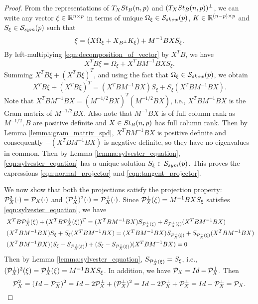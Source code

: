 \documentclass[11pt,a4paper]{article}
\begin{document}
\begin{proof}
From the representations of $T_XSt_B(n,p)$ and $(T_XSt_B(n,p))^\perp$, we can write any vector $\xi\in \mathbb{R}^{n\times p}$ in terms of unique $\Omega_\xi\in \mathcal{S}_{skew}(p)$, $K\in \mathbb{R}^{(n-p)\times p}$ and $S_\xi\in \mathcal{S}_{sym}(p)$ such that
\begin{equation}\label{eqn:decomposition_of_vector}
\xi = (X\Omega_\xi + X_{B^\perp} K_\xi) + M^{-1}BXS_\xi.
\end{equation}
By left-multiplying \eqref{eqn:decomposition_of_vector} by $X^TB$, we have
\begin{equation*}
X^TB\xi = \Omega_\xi + X^TBM^{-1}BXS_\xi.
\end{equation*}
Summing $X^TB\xi+(X^TB\xi)^T$, and using the fact that $\Omega_\xi\in\mathcal{S}_{skew}(p)$, we obtain
\begin{equation}\label{eqn:sylvester_equation}
X^TB\xi+(X^TB\xi)^T = (X^TBM^{-1}BX)S_\xi + S_\xi(X^TBM^{-1}BX).
\end{equation}
Note that $X^TBM^{-1}BX = (M^{-1/2}BX)^T(M^{-1/2}BX)$, i.e., $X^TBM^{-1}BX$ is the Gram matrix of $M^{-1/2}BX$. Also note that $M^{-1}BX$ is of full column rank as $M^{-1/2}, B$ are positive definite and $X\in St_B(n,p)$ has full column rank. Then by Lemma \ref{lemma:gram_matrix_spd}, $X^TBM^{-1}BX$ is positive definite and consequently $-(X^TBM^{-1}BX)$ is negative definite, so they have no eigenvalues in common. Then by Lemma \ref{lemma:sylvester_equation}, \eqref{eqn:sylvester_equation} has a unique solution $S_\xi\in\mathcal{S}_{sym}(p)$. This proves the expressions \eqref{eqn:normal_projector} and \eqref{eqn:tangent_projector}.

We now show that both the projections satisfy the projection property: $\mathcal{P}_X^2(\cdot) = \mathcal{P}_X(\cdot)$ and $(\mathcal{P}^\perp_X)^2(\cdot) = \mathcal{P}^\perp_X(\cdot)$. Since $\mathcal{P}^\perp_X(\xi) = M^{-1}BXS_\xi$ satisfies \eqref{eqn:sylvester_equation}, we have
\begin{align*}
&\;X^TB\mathcal{P}^\perp_X(\xi)+(X^TB\mathcal{P}^\perp_X(\xi))^T = (X^TBM^{-1}BX)S_{\mathcal{P}^\perp_X(\xi)} + S_{\mathcal{P}^\perp_X(\xi)}(X^TBM^{-1}BX) \\
&\;(X^TBM^{-1}BX)S_\xi+S_\xi(X^TBM^{-1}BX) = (X^TBM^{-1}BX)S_{\mathcal{P}^\perp_X(\xi)} + S_{\mathcal{P}^\perp_X(\xi)}(X^TBM^{-1}BX) \\
&\;(X^TBM^{-1}BX)(S_\xi-S_{\mathcal{P}^\perp_X(\xi)})+(S_\xi-S_{\mathcal{P}^\perp_X(\xi)})(X^TBM^{-1}BX) = 0
\end{align*}
Then by Lemma \ref{lemma:sylvester_equation}, $S_{\mathcal{P}^\perp_X(\xi)} = S_\xi$, i.e., $(\mathcal{P}^\perp_X)^2(\xi) = \mathcal{P}^\perp_X(\xi) = M^{-1}BXS_\xi$. In addition, we have $\mathcal{P}_X = Id - \mathcal{P}^\perp_X$. Then 
\begin{equation*}
\mathcal{P}_X^2 = (Id - \mathcal{P}^\perp_X)^2 = Id - 2\mathcal{P}^\perp_X+(\mathcal{P}^\perp_X)^2 = Id - 2\mathcal{P}^\perp_X + \mathcal{P}^\perp_X = Id - \mathcal{P}^\perp_X = \mathcal{P}_X.
\end{equation*}


\end{proof}
\end{document}
